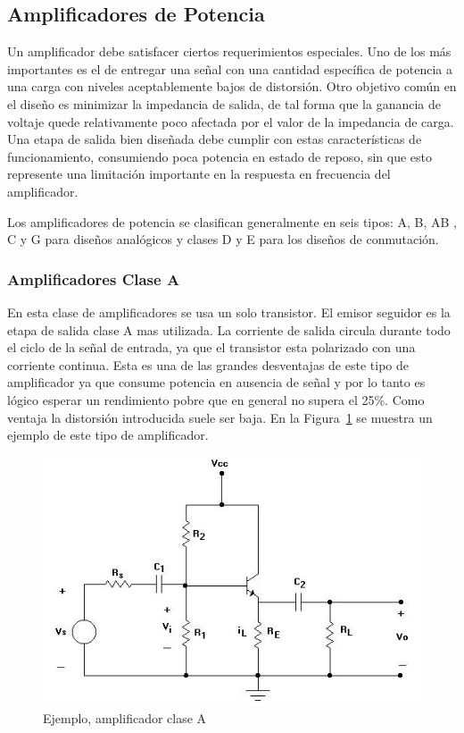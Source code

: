 	\medskip 
\subsection{Amplificadores de Potencia}
	
Un amplificador debe satisfacer ciertos requerimientos especiales. Uno de los más importantes es el de entregar una señal con una cantidad específica de potencia a una carga con niveles aceptablemente bajos de distorsión. Otro objetivo común en el diseño es minimizar la impedancia de salida, de tal forma que la ganancia de voltaje quede relativamente poco afectada por el valor de la impedancia de carga. Una etapa de salida bien diseñada debe cumplir con estas características de funcionamiento, consumiendo poca potencia en estado de reposo, sin que esto represente una limitación importante en la respuesta en frecuencia del amplificador. 
 
Los amplificadores de potencia  se clasifican generalmente en seis tipos: A, B, AB , C y G para diseños analógicos y clases D y E para los diseños de conmutación. 
\medskip 


\subsubsection*{Amplificadores Clase A}


En esta clase de amplificadores se usa un solo transistor. El emisor seguidor es la etapa de salida clase A mas utilizada. La corriente de salida circula durante todo el ciclo de la señal de entrada, ya que el transistor esta polarizado con una corriente continua. Esta es una de las grandes desventajas de este tipo de amplificador ya que consume potencia en ausencia de señal y por lo tanto es lógico esperar un rendimiento pobre que en general no supera el 25\%. Como ventaja la distorsión introducida suele ser baja. En la Figura~\ref{ampliA} se muestra un ejemplo de este tipo de amplificador.
 
\begin{figure}[H]
\centering
\includegraphics[scale=0.6]{img/ampliA.png}
\caption{Ejemplo, amplificador clase A}
\label{ampliA} 
\end{figure}

